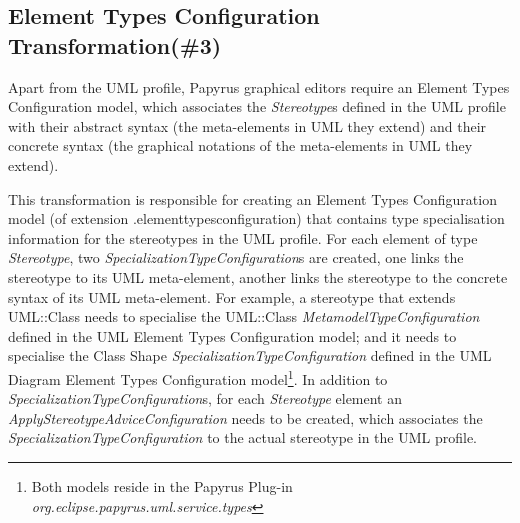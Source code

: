 \subsection{Element Types  Configuration Transformation(\#3)}
\label{sec:elementTypes}
Apart from the UML profile, Papyrus graphical editors require an Element Types Configuration model, which associates the \textit{Stereotype}s defined in the UML profile with their abstract syntax (the meta-elements in UML they extend) and their concrete syntax (the graphical notations of the meta-elements in UML they extend). 

This transformation is responsible for creating an Element Types Configuration model (of extension .elementtypesconfiguration) that contains type specialisation information for the stereotypes in the UML profile. 
For each element of type \textit{Stereotype}, two \textit{SpecializationTypeConfiguration}s are created, one links the stereotype to its UML meta-element, another links the stereotype to the concrete syntax of its UML meta-element.
For example, a stereotype that extends UML::Class needs to specialise the UML::Class \textit{MetamodelTypeConfiguration} defined in the UML Element Types Configuration model; and it needs to specialise the Class Shape \textit{SpecializationTypeConfiguration} defined in the UML Diagram Element Types Configuration model\footnote{Both models reside in the Papyrus Plug-in \textit{org.eclipse.papyrus.uml.service.types}}. 
In addition to \textit{SpecializationTypeConfiguration}s, for each \textit{Stereotype} element an \textit{ApplyStereotypeAdviceConfiguration} needs to be created, which associates the \textit{SpecializationTypeConfiguration} to the actual stereotype in the UML profile.


